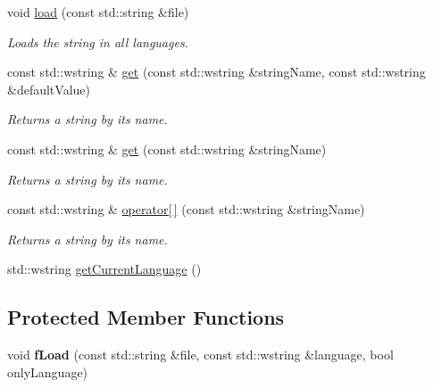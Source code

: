 \begin{DoxyCompactItemize}
void \hyperlink{classzt_1_1_text_container_abb1a77f13098b6593e5edf2d63ed5f3f}{load} (const std\+::string \&file)
\begin{DoxyCompactList}\small\item\em Loads the string in all languages. \end{DoxyCompactList}\item 
const std\+::wstring \& \hyperlink{classzt_1_1_text_container_a851271c69f57caf2ea62fcc63ee96c78}{get} (const std\+::wstring \&string\+Name, const std\+::wstring \&default\+Value)
\begin{DoxyCompactList}\small\item\em Returns a string by its name. \end{DoxyCompactList}\item 
const std\+::wstring \& \hyperlink{classzt_1_1_text_container_a1d8c6bec235308f322cd61cf87a1824d}{get} (const std\+::wstring \&string\+Name)
\begin{DoxyCompactList}\small\item\em Returns a string by its name. \end{DoxyCompactList}\item 
const std\+::wstring \& \hyperlink{classzt_1_1_text_container_ada6e7f11402ab289e02bec50633cd45d}{operator\mbox{[}$\,$\mbox{]}} (const std\+::wstring \&string\+Name)
\begin{DoxyCompactList}\small\item\em Returns a string by its name. \end{DoxyCompactList}\item 
std\+::wstring \hyperlink{classzt_1_1_text_container_a5db66642b418d233e16a6df1f09d7f7c}{get\+Current\+Language} ()
\end{DoxyCompactItemize}
\subsection*{Protected Member Functions}
\begin{DoxyCompactItemize}
\item 
\mbox{\label{classzt_1_1_text_container_ac1c3f13640fd27e8e65793f676aebaaa}} 
void {\bfseries f\+Load} (const std\+::string \&file, const std\+::wstring \&language, bool only\+Language)
\end{DoxyCompactItemize}
